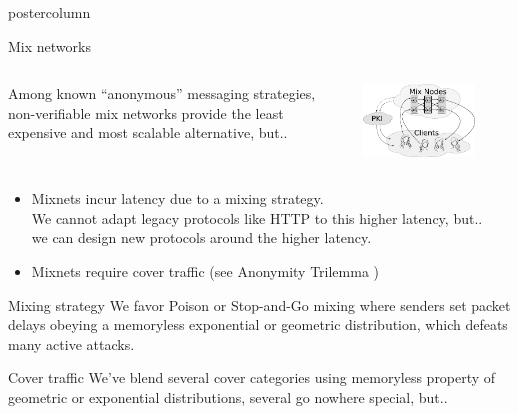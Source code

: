 \documentclass{beamer}
\begin{document}
\begin{frame}
\begin{columns}
\begin{column}{.49\textwidth}
\begin{beamercolorbox}[center,wd=\textwidth]{postercolumn}
\begin{minipage}[T]{.95\textwidth}
{\begin{block}{Mix networks}
\begin{columns}
\begin{column}{.60\textwidth}
                Among known ``anonymous'' messaging strategies, non-verifiable mix networks provide the least expensive and most scalable alternative, but..
                \end{column}
                \begin{column}{.45\textwidth}
                \begin{center}
                \includegraphics[width=0.75\textwidth]{../talks/pics/mix/initial} %
                \end{center}
                \end{column}
                \end{columns}                
                \bigskip

                \begin{itemize}
                \item 
                Mixnets incur latency due to a mixing strategy. \\
                We cannot adapt legacy protocols like HTTP to this higher latency, but.. \\
                we can design new protocols around the higher latency.
                \item 
                Mixnets require cover traffic (see Anonymity Trilemma \cite{anonymity_trilemma}) %
                \end{itemize}
                \bigskip
            \end{block}
            \vfill
            \begin{block}{Mixing strategy}
                We favor Poison or Stop-and-Go mixing where senders set packet delays obeying a memoryless exponential or geometric distribution, which defeats many active attacks. 
                \\ \bigskip
            \end{block}
            \vfill
            \begin{block}{Cover traffic}
                We've blend several cover categories using memoryless property of
                geometric or exponential distributions, several go nowhere special, but.. \\ \bigskip\bigskip


\end{block}}
\end{minipage}
\end{beamercolorbox}
\end{column}
\end{columns}
\end{frame}
\end{document}
